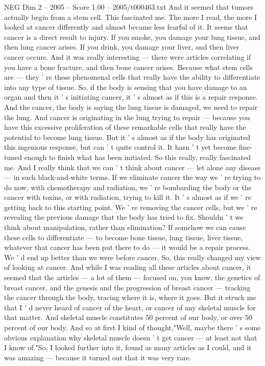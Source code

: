 \begin{textsample}{NEG Dim 2 – 2005 – Score 1.00 – 2005/t000463.txt}
And it seemed that tumors actually begin from a stem cell.
This fascinated me.
The more I read, the more I looked at cancer differently and almost became less fearful of it.
It seems that cancer is a direct result to injury.
If you smoke, you damage your lung tissue, and then lung cancer arises.
If you drink, you damage your liver, and then liver cancer occurs.
And it was really interesting — there were articles correlating if you have a bone fracture, and then bone cancer arises.
Because what stem cells are — they ' re these phenomenal cells that really have the ability to differentiate into any type of tissue.
So, if the body is sensing that you have damage to an organ and then it ' s initiating cancer, it ' s almost as if this is a repair response.
And the cancer, the body is saying the lung tissue is damaged, we need to repair the lung.
And cancer is originating in the lung trying to repair — because you have this excessive proliferation of these remarkable cells that really have the potential to become lung tissue.
But it ' s almost as if the body has originated this ingenious response, but can ' t quite control it.
It hasn ' t yet become fine-tuned enough to finish what has been initiated.
So this really, really fascinated me.
And I really think that we can ' t think about cancer — let alone any disease — in such black-and-white terms.
If we eliminate cancer the way we ' re trying to do now, with chemotherapy and radiation, we ' re bombarding the body or the cancer with toxins, or with radiation, trying to kill it.
It ' s almost as if we ' re getting back to this starting point.
We ' re removing the cancer cells, but we ' re revealing the previous damage that the body has tried to fix.
Shouldn ' t we think about manipulation, rather than elimination?
If somehow we can cause these cells to differentiate — to become bone tissue, lung tissue, liver tissue, whatever that cancer has been put there to do — it would be a repair process.
We ' d end up better than we were before cancer.
So, this really changed my view of looking at cancer.
And while I was reading all these articles about cancer, it seemed that the articles — a lot of them — focused on, you know, the genetics of breast cancer, and the genesis and the progression of breast cancer — tracking the cancer through the body, tracing where it is, where it goes.
But it struck me that I ' d never heard of cancer of the heart, or cancer of any skeletal muscle for that matter.
And skeletal muscle constitutes 50 percent of our body, or over 50 percent of our body.
And so at first I kind of thought,"Well, maybe there ' s some obvious explanation why skeletal muscle doesn ' t get cancer — at least not that I know of."So, I looked further into it, found as many articles as I could, and it was amazing — because it turned out that it was very rare.

\end{textsample}
